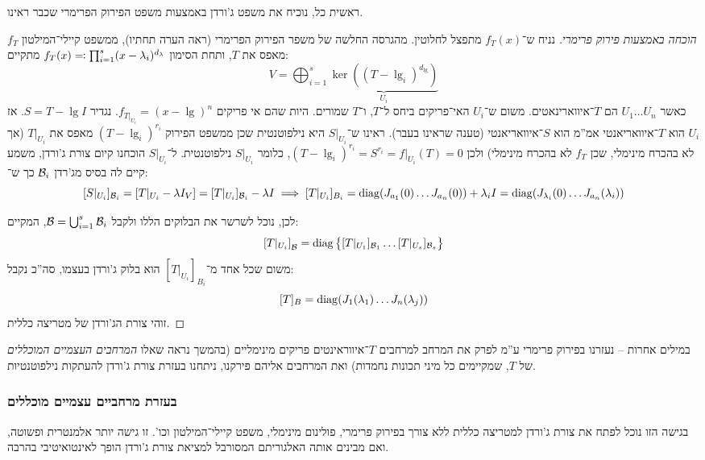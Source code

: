 \documentclass[name=רשימות אלגברה לינארית 2א]{../../../tex/classes/megasumPreamble}
\begin{document}
	ראשית כל, נוכיח את משפט ג'ורדן באמצעות משפט הפירוק הפרימרי שכבר ראינו. 
	\begin{proof}[הוכחה באמצעות פירוק פרימרי]
		נניח ש־$f_T(x)$ מתפצל לחלוטין. מהגרסה החלשה של משפר הפירוק הפרימרי (ראה הערה תחתיו), ממשפט קיילי־המילטון $f_T$ מאפס את $T$, ותחת הסימון $f_T(x) \eqqcolon \prod_{i = 1}^{s}(x - \lambda_i)^{d_{\lambda}}$  מתקיים: 
		\[ V = \bigoplus_{i = 1}^{s} \underbrace{\ker ((T - \lg_i)^{d_{\lg}})}_{U_i} \]
		כאשר $U_1 \dots U_n$ הם $T$־איווארינאטים. 
		משום ש־$U_i$ האי־פריקים ביחס ל־$T$, ו־$T$ שמורים. היות שהם אי פריקים $f_{T|_{U_i}} = (x - \lg)^{n}$. נגדיר $S = T - \lg I$. אז $U_i$ הוא $T$־איוואריאנטי אמ''מ הוא $S$־איוואריאנטי (טענה שראינו בעבר). 
		ראינו ש־$S|_{U_i}$ היא נילפוטנטית שכן ממשפט הפירוק $(T - \lg_i)^{r_i}$ מאפס את $T|_{U_i}$ (אך לא בהכרח מינימלי, שכן $f_T$ לא בהכרח מינימלי) ולכן $(T - \lg_i)^{r_i} = S^{r_i} = f|_{U_i}(T) = 0$, כלומר $S|_{U_i}$ נילפוטנטית. ל־$S|_{U_i}$ הוכחנו קיום צורת ג'ורדן, משמע קיים לה בסיס מג'רדן $\mathcal{B}_i$ כך ש־: 
		\[ [S|_{U_i}]_{\mathcal{B}_i} = [T|_{U_i} - \lambda I_V] = [T|_{U_i}]_{\mathcal{B}_i} - \lambda I \implies [T|_{U_i}]_{B_i} = \operatorname{diag}(J_{a_1}(0) \dots J_{a_n}(0)) + \lambda_i I = \operatorname{diag}(J_{\lambda_i}(0) \dots J_{a_n}(\lambda_i)) \]
		
		לכן, נוכל לשרשר את הבלוקים הללו ולקבל $\mathcal{B} = \bigcup_{i = 1}^{s} \mathcal{B}_i$, המקיים: 
		\[ \left [ T|_{{U_i}} \right ]_{\mathcal{B}} = \operatorname{diag}\big\{[T|_{U_1}]_{\mathcal{B}_1} \dots [T|_{U_s}]_{\mathcal{B}_s} \big\} \]
		משום שכל אחד מ־$[T|_{U_i}]_{B_i}$ הוא בלוק ג'ורדן בעצמו, סה''כ נקבל: 
		\[ [T]_B = \operatorname{diag}(J_1(\lambda_1) \dots J_n(\lambda_j)) \]
		זוהי צורת הג'ורדן של מטריצה כללית. 
	\end{proof}
	במילים אחרות – נעזרנו בפירוק פרימרי ע''מ לפרק את המרחב למרחבים $T$־איווראינטים פריקים מינימליים (בהמשך נראה שאלו \textit{המרחבים העצמיים המוכללים} של $T$, שמקיימים כל מיני תכונות נחמדות) ואת המרחבים אליהם פירקנו, ניתחנו בעזרת צורת ג'ורדן להעתקות נילפוטנטיות. 
	
	
	\subsubsection{בעזרת מרחביים עצמיים מוכללים}
	בגישה הזו נוכל לפתח את צורת ג'ורדן למטריצה כללית ללא צורך בפירוק פרימרי, פולינום מינימלי, משפט קיילי־המילטון וכו'. זו גישה יותר אלמנטרית ופשוטה, ואם מבינים אותה האלגוריתם המסורבל למציאת צורת ג'ורדן הופך לאינטואיטיבי בהרבה. 
	\prooftrivial
	
\end{document}
